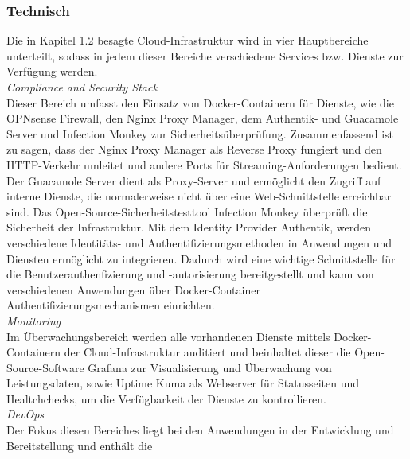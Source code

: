 \subsubsection{Technisch}
\label{sec:Technisch}
Die in Kapitel 1.2 besagte Cloud-Infrastruktur wird in vier  
Hauptbereiche unterteilt, sodass in jedem dieser Bereiche verschiedene Services bzw. 
Dienste zur Verfügung werden.
\\\textit{Compliance and Security Stack}
\\Dieser Bereich umfasst den Einsatz von Docker-Containern für Dienste, wie die OPNsense Firewall, 
den Nginx Proxy Manager, dem Authentik- und Guacamole Server und Infection Monkey zur Sicherheitsüberprüfung. 
Zusammenfassend ist zu sagen, dass der Nginx Proxy Manager als Reverse Proxy fungiert und den HTTP-Verkehr 
umleitet und andere Ports für Streaming-Anforderungen bedient. Der Guacamole Server dient als Proxy-Server 
und ermöglicht den Zugriff auf interne Dienste, die normalerweise nicht über eine Web-Schnittstelle erreichbar sind.
Das Open-Source-Sicherheitstesttool Infection Monkey überprüft die Sicherheit der Infrastruktur. 
Mit dem Identity Provider Authentik, werden verschiedene Identitäts- und Authentifizierungsmethoden in 
Anwendungen und Diensten ermöglicht zu integrieren. Dadurch wird eine wichtige Schnittstelle für die 
Benutzerauthenfizierung und -autorisierung bereitgestellt und kann von verschiedenen Anwendungen über 
Docker-Container Authentifizierungsmechanismen einrichten.
\\\textit{Monitoring}
\\Im Überwachungsbereich werden alle vorhandenen Dienste mittels Docker-Containern der Cloud-Infrastruktur auditiert 
und beinhaltet dieser die Open-Source-Software Grafana zur Visualisierung und Überwachung von Leistungsdaten, sowie 
Uptime Kuma als Webserver für Statusseiten und Healtchchecks, um die Verfügbarkeit der Dienste zu kontrollieren. 
\\\textit{DevOps}
\\Der Fokus diesen Bereiches liegt bei den Anwendungen in der Entwicklung und Bereitstellung und enthält die 
